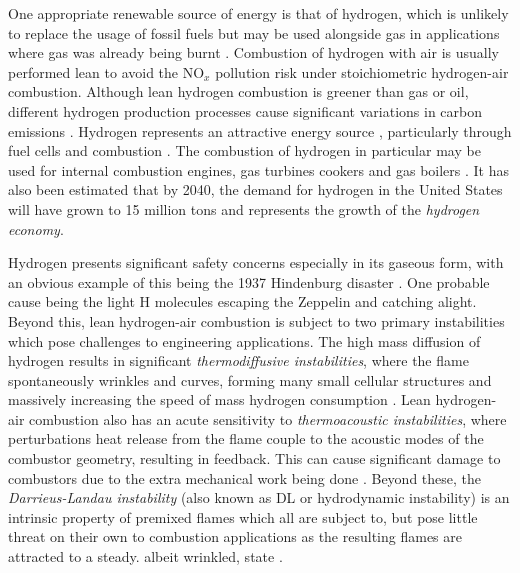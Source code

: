 One appropriate renewable source of energy is that of hydrogen, which is unlikely to replace the usage of fossil fuels but may be used alongside gas in applications where gas was already being burnt \cite{momirlan2005PropertiesHydrogenFuel}. Combustion of hydrogen with air is usually performed lean to avoid the NO$_x$ pollution risk under stoichiometric hydrogen-air combustion. Although lean hydrogen combustion is greener than gas or oil, different hydrogen production processes \cite{dasilvaveras2017HydrogenTrendsProduction} cause significant variations in carbon emissions \cite{nationalgrid2022HeatingOurHomes}. Hydrogen represents an attractive energy source \cite{momirlan2005PropertiesHydrogenFuel}, particularly through fuel cells \cite{momirlan2005PropertiesHydrogenFuel} and combustion \cite{lanz2001Module3Hydrogen, stepien2021ComprehensiveOverviewHydrogenFueled}. The combustion of hydrogen in particular may be used for internal combustion engines, gas turbines cookers and gas boilers \cite{momirlan2005PropertiesHydrogenFuel}. It has also been estimated that by 2040, the demand for hydrogen in the United States will have grown to 15 million tons \cite{molkov2007HydrogenSafetyResearch} and represents the growth of the \emph{hydrogen economy}.

Hydrogen presents significant safety concerns \cite{green2006HydrogenSafetyIssues} especially in its gaseous form, with an obvious example of this being the 1937 Hindenburg disaster \cite{dilisi2017HindenburgDisasterCombining}. One probable cause being the light H molecules escaping the Zeppelin and catching alight. Beyond this, lean hydrogen-air combustion is subject to two primary instabilities which pose challenges to engineering applications. The high mass diffusion of hydrogen results in significant \emph{thermodiffusive instabilities}, where the flame spontaneously wrinkles and curves, forming many small cellular structures \cite{sivashinsky1983InstabilitiesPatternFormation} and massively increasing the speed of mass hydrogen consumption \cite{howarth2023ThermodiffusivelyUnstableLeanPremixed}. Lean hydrogen-air combustion also has an acute sensitivity to \emph{thermoacoustic instabilities}, where perturbations heat release from the flame couple to the acoustic modes of the combustor geometry, resulting in feedback. This can cause significant damage to combustors due to the extra mechanical work being done \cite{morgans2024ThermoacousticInstabilityCombustors}. Beyond these, the \emph{Darrieus-Landau instability} (also known as DL or hydrodynamic instability) is an intrinsic property of premixed flames which all are subject to, but pose little threat on their own to combustion applications as the resulting flames are attracted to a steady. albeit wrinkled, state \cite{matalon2018DarrieusLandauInstability}.

